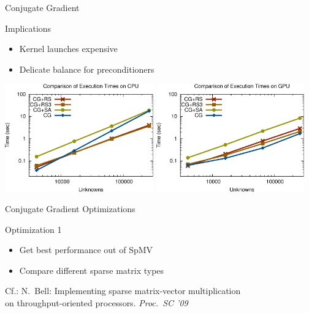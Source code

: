 \begin{frame}[fragile]{Conjugate Gradient}

 \begin{block}{Implications}
   \begin{itemize}
   \item Kernel launches expensive
   \item Delicate balance for preconditioners
  \end{itemize}
  
      \vspace*{.8cm}
  \begin{center}
   \includegraphics[width=0.48\textwidth]{figures/cpu_scaling-2} \hfill
   \includegraphics[width=0.48\textwidth]{figures/gpu_scaling-2}
  \end{center}
      \vspace*{.8cm}  
 \end{block}
   
\end{frame}



\begin{frame}[fragile]{Conjugate Gradient Optimizations}

 \vspace*{2cm}
 \begin{block}{Optimization 1}
   \begin{itemize}
   \item Get best performance out of SpMV
   \item Compare different sparse matrix types
  \end{itemize}
 \end{block}

 \vspace*{2cm}
    {\small Cf.: N.~Bell: Implementing sparse matrix-vector multiplication\\ on throughput-oriented processors. \textit{Proc.~SC '09}}


\end{frame}

